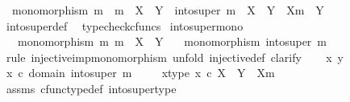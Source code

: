 \begin{isabellebody}
\ \ {\isachardoublequoteopen}monomorphism\ m\ {\isasymLongrightarrow}\ m\ {\isacharcolon}{\kern0pt}\ X\ {\isasymrightarrow}\ Y\ {\isasymLongrightarrow}\ into{\isacharunderscore}{\kern0pt}super\ m\ {\isacharcolon}{\kern0pt}\ X\ {\isasymCoprod}\ {\isacharparenleft}{\kern0pt}Y\ {\isasymsetminus}\ {\isacharparenleft}{\kern0pt}X{\isacharcomma}{\kern0pt}m{\isacharparenright}{\kern0pt}{\isacharparenright}{\kern0pt}\ {\isasymrightarrow}\ Y{\isachardoublequoteclose}\isanewline
%
\isadelimproof
\ \ %
\endisadelimproof
%
\isatagproof
{}\isamarkupfalse%
\ into{\isacharunderscore}{\kern0pt}super{\isacharunderscore}{\kern0pt}def\ \isamarkupfalse%
\ typecheck{\isacharunderscore}{\kern0pt}cfuncs%
\endisatagproof
{\isafoldproof}%
%
\isadelimproof
\isanewline
%
\endisadelimproof
\isanewline
{}\isamarkupfalse%
\ into{\isacharunderscore}{\kern0pt}super{\isacharunderscore}{\kern0pt}mono{\isacharcolon}{\kern0pt}\isanewline
\ \ \ {\isachardoublequoteopen}monomorphism\ m{\isachardoublequoteclose}\ {\isachardoublequoteopen}m\ {\isacharcolon}{\kern0pt}\ X\ {\isasymrightarrow}\ Y{\isachardoublequoteclose}\isanewline
\ \ \ {\isachardoublequoteopen}monomorphism\ {\isacharparenleft}{\kern0pt}into{\isacharunderscore}{\kern0pt}super\ m{\isacharparenright}{\kern0pt}{\isachardoublequoteclose}\isanewline
%
\isadelimproof
%
\endisadelimproof
%
\isatagproof
{}\isamarkupfalse%
\ {\isacharparenleft}{\kern0pt}rule\ injective{\isacharunderscore}{\kern0pt}imp{\isacharunderscore}{\kern0pt}monomorphism{\isacharcomma}{\kern0pt}\ unfold\ injective{\isacharunderscore}{\kern0pt}def{\isacharcomma}{\kern0pt}\ clarify{\isacharparenright}{\kern0pt}\isanewline
\ \ \isamarkupfalse%
\ x\ y\isanewline
\ \ \isamarkupfalse%
\ {\isachardoublequoteopen}x\ {\isasymin}\isactrlsub c\ domain\ {\isacharparenleft}{\kern0pt}into{\isacharunderscore}{\kern0pt}super\ m{\isacharparenright}{\kern0pt}{\isachardoublequoteclose}\ \ \isamarkupfalse%
\ \isamarkupfalse%
\ x{\isacharunderscore}{\kern0pt}type{\isacharcolon}{\kern0pt}\ {\isachardoublequoteopen}x\ {\isasymin}\isactrlsub c\ X\ {\isasymCoprod}\ {\isacharparenleft}{\kern0pt}Y\ {\isasymsetminus}\ {\isacharparenleft}{\kern0pt}X{\isacharcomma}{\kern0pt}m{\isacharparenright}{\kern0pt}{\isacharparenright}{\kern0pt}{\isachardoublequoteclose}\isanewline
\ \ \ \ \isamarkupfalse%
\ assms\ cfunc{\isacharunderscore}{\kern0pt}type{\isacharunderscore}{\kern0pt}def\ into{\isacharunderscore}{\kern0pt}super{\isacharunderscore}{\kern0pt}type\ \isamarkupfalse%

\end{isabellebody}
